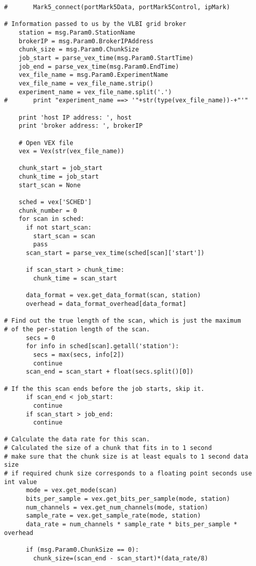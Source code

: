 \begin{verbatim}
#		Mark5_connect(portMark5Data, portMark5Control, ipMark) 

# Information passed to us by the VLBI grid broker
    station = msg.Param0.StationName
    brokerIP = msg.Param0.BrokerIPAddress
    chunk_size = msg.Param0.ChunkSize
    job_start = parse_vex_time(msg.Param0.StartTime)
    job_end = parse_vex_time(msg.Param0.EndTime)
    vex_file_name = msg.Param0.ExperimentName
    vex_file_name = vex_file_name.strip()
    experiment_name = vex_file_name.split('.')
#		print "experiment_name ==> '"+str(type(vex_file_name))-+"'"
    
    print 'host IP address: ', host
    print 'broker address: ', brokerIP
    
    # Open VEX file
    vex = Vex(str(vex_file_name))

    chunk_start = job_start
    chunk_time = job_start
    start_scan = None

    sched = vex['SCHED']
    chunk_number = 0
    for scan in sched:
      if not start_scan:
        start_scan = scan
        pass
      scan_start = parse_vex_time(sched[scan]['start'])

      if scan_start > chunk_time:
        chunk_time = scan_start

      data_format = vex.get_data_format(scan, station)
      overhead = data_format_overhead[data_format]

# Find out the true length of the scan, which is just the maximum
# of the per-station length of the scan.
      secs = 0
      for info in sched[scan].getall('station'):
        secs = max(secs, info[2])
        continue
      scan_end = scan_start + float(secs.split()[0])

# If the this scan ends before the job starts, skip it.
      if scan_end < job_start:
        continue
      if scan_start > job_end:
        continue

# Calculate the data rate for this scan.
# Calculated the size of a chunk that fits in to 1 second
# make sure that the chunk size is at least equals to 1 second data size
# if required chunk size corresponds to a floating point seconds use int value
      mode = vex.get_mode(scan)
      bits_per_sample = vex.get_bits_per_sample(mode, station)
      num_channels = vex.get_num_channels(mode, station)
      sample_rate = vex.get_sample_rate(mode, station)
      data_rate = num_channels * sample_rate * bits_per_sample * overhead

      if (msg.Param0.ChunkSize == 0):
        chunk_size=(scan_end - scan_start)*(data_rate/8)


\end{verbatim}
